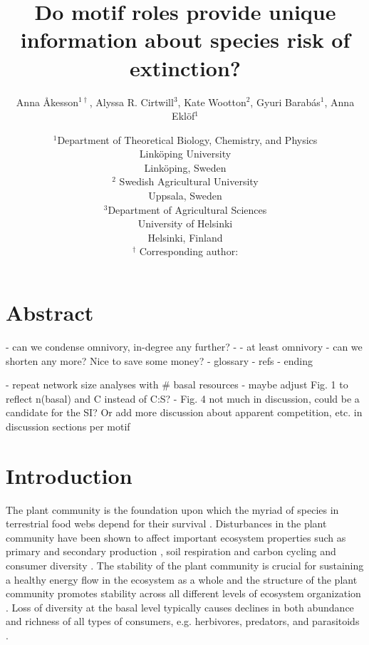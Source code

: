 \documentclass[12pt]{article}
\title{Do motif roles provide unique information about species risk of extinction?}
\author{Anna \r{A}kesson$^{1\dagger}$, Alyssa R. Cirtwill$^{3}$, Kate Wootton$^{2}$, Gyuri Barab\'{a}s$^{1}$, Anna Ekl\"{o}f$^{1}$}
\date{\small$^1$Department of Theoretical Biology, Chemistry, and Physics\\ 
Link\"{o}ping University\\
Link\"{o}ping, Sweden\\
\medskip
\small$^2$ Swedish Agricultural University\\
Uppsala, Sweden\\
\medskip
\small$^3$Department of Agricultural Sciences\\
University of Helsinki\\
Helsinki, Finland\\
\medskip
$^\dagger$ Corresponding author:\\
}
\begin{document}
 
\maketitle 
\raggedright

\setlength{\parindent}{15pt} 
\begin{spacing}{2.0}


\section*{Abstract}

    - can we condense omnivory, in-degree any further?
    - - at least omnivory
    - can we shorten any more? Nice to save some money?
    - glossary
    - refs
    - ending

    - repeat network size analyses with \# basal resources - maybe adjust Fig. 1 to reflect n(basal) and C instead of C:S?
    - Fig. 4 not much in discussion, could be a candidate for the SI? Or add more discussion about apparent competition, etc. in discussion sections per motif

\clearpage
\section*{Introduction}

     The plant community is the foundation upon which the myriad of species in terrestrial food webs depend for their survival \citep{}. Disturbances in the plant community have been shown to affect important ecosystem properties such as primary \citep{} and secondary production \citep{borer2012plant}, soil respiration and carbon cycling \citep{chen2019plant} and consumer diversity \citep{scherber2010bottom, Baiser2016}. The stability of the plant community is crucial for sustaining a healthy energy flow in the ecosystem as a whole \citep{Rosenblatt2016} and the structure of the plant community promotes stability across all different levels of ecosystem organization \citep{proulx2010diversity,scherber2010bottom}. Loss of diversity at the basal level typically causes declines in both abundance and richness of all types of consumers, e.g. herbivores, predators, and parasitoids \citep{scherber2010bottom}.
    

\end{spacing}
\end{document}
